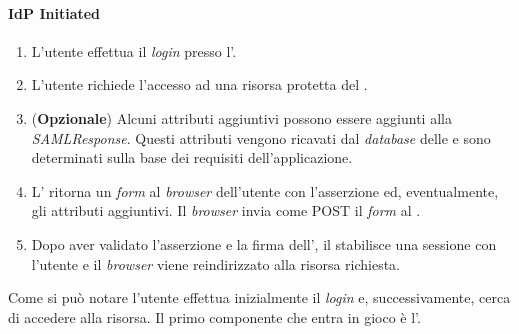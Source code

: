 \paragraph{IdP Initiated}
\begin{enumerate}
\item L'utente effettua il \textit{login} presso l'.
\item L'utente richiede l'accesso ad una risorsa protetta del .
\item (\textbf{Opzionale}) Alcuni attributi aggiuntivi possono essere aggiunti alla \textit{SAMLResponse}. Questi attributi vengono ricavati dal \textit{database} delle  e sono determinati sulla base dei requisiti dell'applicazione.
\item L' ritorna un \textit{form} al \textit{browser} dell'utente con l'asserzione  ed, eventualmente, gli attributi aggiuntivi. Il \textit{browser} invia come POST il \textit{form} al .
\item Dopo aver validato l'asserzione e la firma dell', il  stabilisce una sessione con l'utente e il \textit{browser} viene reindirizzato alla risorsa richiesta.
\end{enumerate}
Come si può notare l'utente effettua inizialmente il \textit{login} e, successivamente, cerca di accedere alla risorsa. Il primo componente che entra in gioco è l'.

